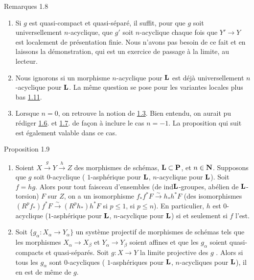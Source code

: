 \documentclass[10pt]{../fichiers-configuration-latex/smfart}
\begin{document}
\begin{enonce*}[remark]{Remarques 1.8}
\begin{enumerate}
\renewcommand{\theenumi}{\alph{enumi}}
\renewcommand{\labelenumi}{\theenumi)}
\item Si $g$ est quasi-compact et quasi-séparé, il suffit, pour que
$g$ soit universellement $n$-acyclique, que $g'$ soit $n$-acyclique
chaque fois que $Y'\rightarrow Y$ est localement de présentation
finie. Nous n'avons pas besoin de ce fait et en laissons la
démonstration, qui est un exercice de passage à la limite, au lecteur.

\item Nous ignorons si un morphisme $n$-acyclique pour $\mathbf{L}$
est déjà universellement $n$-acyclique pour $\mathbf{L}$. La même
question se pose pour les variantes locales plus bas \hyperref[XV.def1.11]{1.11}.

\item Lorsque $n=0$, on retrouve la notion de \hyperref[XV.def1.3]{1.3}. Bien
entendu, on aurait pu rédiger \hyperref[XV.prop1.6]{1.6}. et \hyperref[XV.def1.7]{1.7}. de
façon à inclure le cas $n=-1$. La proposition qui suit est
également valable dans ce cas.\pageoriginale
\end{enumerate}
\end{enonce*}

\begin{enonce*}{Proposition 1.9}
\begin{enumerate}
\renewcommand{\theenumi}{\roman{enumi}}
\renewcommand{\labelenumi}{(\theenumi)}
\item Soient $X\xrightarrow{g}Y\xrightarrow{h}Z$ des morphismes de
schémas, $\mathbf{L}\subset \mathbf{P}$, et $n\in
\mathbf{N}$. Supposons que $g$ soit $0$-acyclique (\resp
$1$-asphérique pour $\mathbf{L}$, \resp $n$-acyclique pour
$\mathbf{L}$). Soit $f=hg$. Alors pour tout faisceau d'ensembles
(\resp de ind\sisi{-}{ }$\mathbf{L}$-groupes, \resp abélien de
$\mathbf{L}$-torsion) $F$ sur $Z$, on a un isomorphisme
$f_{\ast}f^{\ast}F\xrightarrow{\sim} h_{\ast}h^{\ast}F$ (\resp des
isomorphismes $(R^{p}f_{\ast})f^{\ast}F\xrightarrow{\sim}
(R^{p}h_{\ast})h^{\ast}F$ si $p\leq 1$, \resp si $p\leq n$). En
particulier, $h$ est $0$-acyclique (\resp $1$-asphérique pour
$\mathbf{L}$, \resp $n$-acyclique pour $\mathbf{L}$) si et seulement
si $f$ l'est.

\item Soit $\{g_{\alpha}:X_{\alpha}\rightarrow Y_{\alpha}\}$ un
système projectif de morphismes de schémas tels que les morphismes
$X_{\alpha}\rightarrow X_{\beta}$ et $Y_{\alpha}\rightarrow Y_{\beta}$
soient affines et que les $g_{\alpha}$ soient quasi-compacts et
quasi-séparés. Soit $g:X\rightarrow Y$ la limite projective des $g$
.
Alors si tous les $g_{\alpha}$ sont $0$-acycliques (\resp
$1$-asphériques pour $\mathbf{L}$, \resp $n$-acycliques pour
$\mathbf{L}$), il en est de même de $g$.
\end{enumerate}
\end{enonce*}
\end{document}

